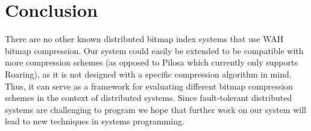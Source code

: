\section{Conclusion}
There are no other known distributed bitmap index systems that use WAH bitmap
compression. Our system could easily be extended to be compatible with more
compression schemes (as opposed to Pilosa which currently only supports
Roaring), as it is not designed with a specific compression algorithm in mind.
Thus, it can serve as a framework for evaluating different bitmap compression
schemes in the context of distributed systems. Since fault-tolerant distributed
systems are challenging to program \cite{kleppmann2017} we hope that further
work on our system will lead to new techniques in systems programming.
